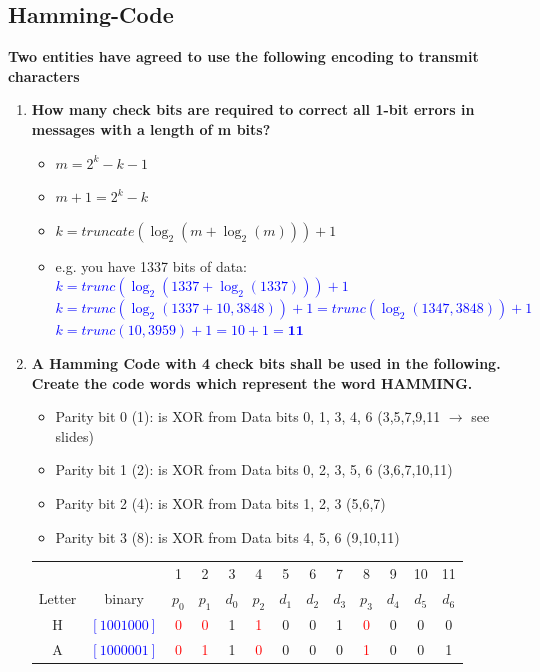 \documentclass[a4paper,12pt]{article}
\begin{document}
	\subsection{Hamming-Code}
	\textbf{Two entities have agreed to use the following encoding to transmit characters}
	\begin{enumerate}[itemsep=0pt]
		\item \textbf{How many check bits are required to correct all 1-bit errors in messages with a length of m bits?}
		\begin{itemize}[itemsep=0pt]
			\item $m = 2^k - k - 1 $
			\item $m + 1 = 2^k - k $
			\item $k = truncate(\log_2(m+\log_2(m))) + 1$
			\item e.g. you have 1337 bits of data:\\
			\textcolor{blue}{ $k = trunc(\log_2(1337 + \log_2(1337))) + 1$\\
			$k = trunc(\log_2(1337 + 10,3848)) + 1 = trunc(\log_2(1347,3848)) + 1$\\
			$k = trunc(10,3959) + 1 = 10 + 1 = \textbf{11}$}
		\end{itemize}
		\item \textbf{A Hamming Code with 4 check bits shall be used in the following.  Create the code words which represent the word HAMMING.}
		\begin{itemize}[itemsep=0pt]	
			\item Parity bit 0 (1): is XOR from Data bits 0, 1, 3, 4, 6 (3,5,7,9,11 $\rightarrow$ see slides) 
			\item Parity bit 1 (2): is XOR from Data bits 0, 2, 3, 5, 6 (3,6,7,10,11) 
			\item Parity bit 2 (4): is XOR from Data bits 1, 2, 3 (5,6,7)
			\item Parity bit 3 (8): is XOR from Data bits 4, 5, 6 (9,10,11)
		\end{itemize}
		\begin{tabular}{c|c|ccccccccccc}
			~ & ~ & 1 & 2 & 3 & 4 & 5 & 6 & 7 & 8 & 9 & 10 & 11 \\
			Letter & binary & $p_0$ & $p_1$ & $d_0$ & $p_2$ & $d_1$ & $d_2$ & $d_3$ & $p_3$ & $d_4$ & $d_5$ & $d_6$ \\ \hline
			H & \textcolor{blue}{$[1001000]$} & \textcolor{red}{0} & \textcolor{red}{0} & 1 & \textcolor{red}{1} & 0 & 0 & 1 & \textcolor{red}{0} & 0 & 0 & 0 \\
			A & \textcolor{blue}{$[1000001]$} & \textcolor{red}{0} & \textcolor{red}{1} & 1 & \textcolor{red}{0} & 0 & 0 & 0 & \textcolor{red}{1} & 0 & 0 & 1 \\

\end{tabular}
\end{enumerate}
\end{document}
